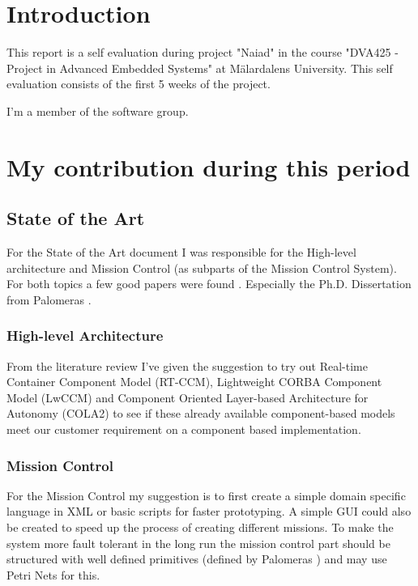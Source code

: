 \section{Introduction}
This report is a self evaluation during project "Naiad" in the course
"DVA425 - Project in Advanced Embedded Systems" at M\"{a}lardalens University.
This self evaluation consists of the first 5 weeks of the project.

I'm a member of the software group.

\section{My contribution during this period}
\subsection{State of the Art}
For the State of the Art document I was responsible for the High-level
architecture and Mission Control (as subparts of the Mission Control System).
For both topics a few good papers were found
\cite{palomeras2012,palomeras2011,martinez2008,martinez2013}.
Especially the Ph.D. Dissertation from Palomeras \cite{palomeras2011}.

\subsubsection{High-level Architecture}
From the literature review I've given the suggestion to try out
Real-time Container Component Model (RT-CCM),
Lightweight CORBA Component Model (LwCCM) and
Component Oriented Layer-based Architecture for Autonomy (COLA2) to see if
these already available component-based models meet our
customer requirement on a component based implementation.

\subsubsection{Mission Control}
For the Mission Control my suggestion is to first create a simple domain
specific language in XML or basic scripts for faster prototyping. A simple
GUI could also be created to speed up the process of creating different missions.
To make the system more fault tolerant in the long run the mission control part
should be structured with well defined primitives (defined by Palomeras
\cite{palomeras2011}) and may use Petri Nets for this.

